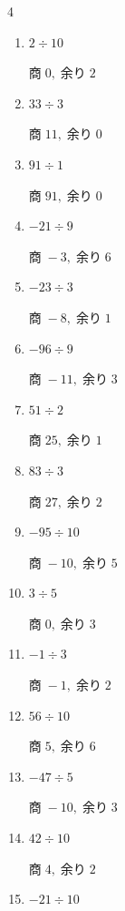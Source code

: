 \begin{multicols}{4}
\begin{enumerate}
        $商\; -1,\; 余り\; 1$

  \item $2 \div 10$

        $商\; 0,\; 余り\; 2$

  \item $33 \div 3$

        $商\; 11,\; 余り\; 0$

  \item $91 \div 1$

        $商\; 91,\; 余り\; 0$

  \item $-21 \div 9$

        $商\; -3,\; 余り\; 6$

  \item $-23 \div 3$

        $商\; -8,\; 余り\; 1$

  \item $-96 \div 9$

        $商\; -11,\; 余り\; 3$

  \item $51 \div 2$

        $商\; 25,\; 余り\; 1$

  \item $83 \div 3$

        $商\; 27,\; 余り\; 2$

  \item $-95 \div 10$

        $商\; -10,\; 余り\; 5$

  \item $3 \div 5$

        $商\; 0,\; 余り\; 3$

  \item $-1 \div 3$

        $商\; -1,\; 余り\; 2$

  \item $56 \div 10$

        $商\; 5,\; 余り\; 6$

  \item $-47 \div 5$

        $商\; -10,\; 余り\; 3$

\columnbreak %

  \item $42 \div 10$

        $商\; 4,\; 余り\; 2$

  \item $-21 \div 10$


\end{enumerate}
\end{multicols}

